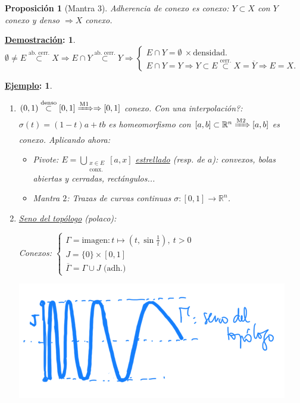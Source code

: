 \documentclass[10pt,a4paper,openright]{book}
\theoremstyle{break}
\newtheorem*{prop}{Proposición}
\newtheorem*{demo}{\underline{Demostración}:}
\newtheorem*{ej}{\underline{Ejemplo}:}
\begin{document}
\begin{prop}[Mantra 3]
Adherencia de conexo es conexo: $Y \subset X$ con $Y$ conexo y denso $\Rightarrow X$ conexo. 
\end{prop}
\begin{demo}
    $\emptyset \neq E \stackrel{\text{ab. cerr.}}{\subset} X \Rightarrow E \cap Y \stackrel{\text{ab. cerr.}}{\subset} Y \Rightarrow \begin{cases}
        E \cap Y = \emptyset\ \times \text{densidad.} \\
        E \cap Y = Y \Rightarrow Y \subset E \stackrel{\text{cerr.}}{\subset} X = \overline{Y} \Rightarrow E = X.
    \end{cases}$
\end{demo}

\begin{ej}
    \begin{enumerate}
        \item $\left( 0, 1 \right) \stackrel{\text{denso}}{\subset} \left[ 0, 1 \right] \xRightarrow{\mathrm{M}1} \Rightarrow \left[ 0, 1 \right]$ conexo. Con una interpolación?: $\sigma\left( t \right) = \left( 1 - t \right) a + tb$ es homeomorfismo con $\left[ a, b \right] \subset \mathbb{R}^n \xRightarrow{\mathrm{M}2} \left[ a, b \right]$ es conexo. Aplicando ahora:
        \begin{itemize}
            \item Pivote: $E = \bigcup_{\substack{x \in E\\ \text{conx.}}} \left[ a, x \right]$ \underline{estrellado} (resp. de $a$): convexos, bolas abiertas y cerradas, rectángulos... 
            \item Mantra $2$: Trazas de curvas continuas $\sigma: \left[ 0, 1 \right] \rightarrow \mathbb{R}^n$.
        \end{itemize}
        \item \underline{Seno del topólogo} (polaco):

        Conexos: $\begin{cases}
            \Gamma = \text{imagen} : t \mapsto \left( t, \sin \frac{1}{t} \right),\ t > 0\\
            J = \{0\} \times \left[ 0, 1 \right]\\
            \overline{\Gamma} = \Gamma \cup J \text{ (adh.)} 
        \end{cases}$
        \begin{center}
            \includegraphics[scale=0.3]{images/seno_topologo} 
        \end{center}
    \end{enumerate}
\end{ej}
\end{document}
